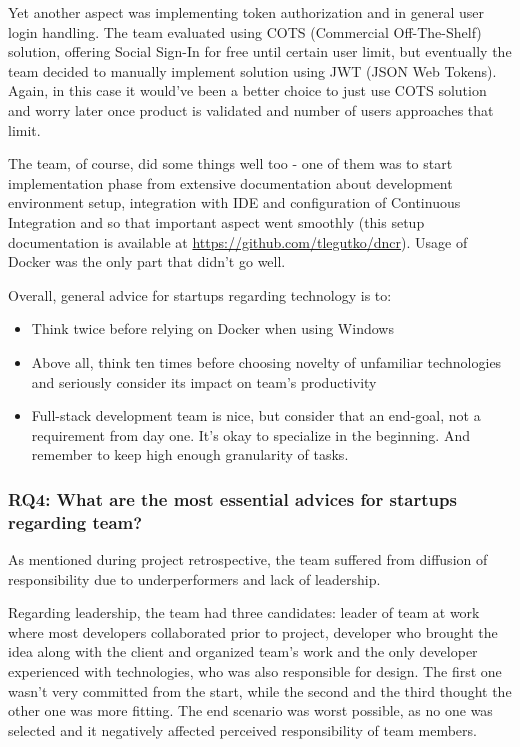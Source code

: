 \documentclass{article}
\begin{document}
Yet another aspect was implementing token authorization and in general user login handling. The team evaluated using COTS (Commercial Off-The-Shelf) solution, offering Social Sign-In for free until certain user limit, but eventually the team decided to manually implement solution using JWT (JSON Web Tokens). Again, in this case it would've been a better choice to just use COTS solution and worry later once product is validated and number of users approaches that limit.

The team, of course, did some things well too - one of them was to start implementation phase from extensive documentation about development environment setup, integration with IDE and configuration of Continuous Integration and so that important aspect went smoothly (this setup documentation is available at \url{https://github.com/tlegutko/dncr}). Usage of Docker was the only part that didn't go well.

Overall, general advice for startups regarding technology is to:
\begin{itemize}
\item Think twice before relying on Docker when using Windows
\item Above all, think ten times before choosing novelty of unfamiliar technologies and seriously consider its impact on team's productivity
\item Full-stack development team is nice, but consider that an end-goal, not a requirement from day one. It's okay to specialize in the beginning. And remember to keep high enough granularity of tasks.
\end{itemize}

\subsubsection{RQ4: What are the most essential advices for startups regarding team?}
As mentioned during project retrospective, the team suffered from diffusion of responsibility due to underperformers and lack of leadership.

Regarding leadership, the team had three candidates: leader of team at work where most developers collaborated prior to project, developer who brought the idea along with the client and organized team's work and the only developer experienced with technologies, who was also responsible for design. The first one wasn't very committed from the start, while the second and the third thought the other one was more fitting. The end scenario was worst possible, as no one was selected and it negatively affected perceived responsibility of team members.
\end{document}
